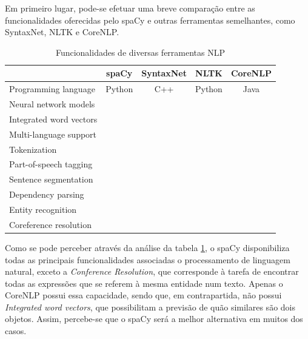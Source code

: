 \documentclass[12pt]{article}
\newcommand{\cmark}{\color[rgb]{0,0.7,0}\ding{51}}%
\newcommand{\xmark}{\color[rgb]{0.7,0,0}\ding{55}}%
\begin{document}
Em primeiro lugar, pode-se efetuar uma breve comparação entre as funcionalidades oferecidas pelo spaCy e outras ferramentas semelhantes, como SyntaxNet, NLTK e CoreNLP.

\begin{table}[!ht]
	\centering
	\renewcommand{\arraystretch}{1.3}
	\begin{tabular}{l|c|c|c|c|}
		\cline{2-5}
	& \cellcolor[HTML]{C0C0C0}\textbf{spaCy} & \cellcolor[HTML]{C0C0C0}\textbf{SyntaxNet} & \cellcolor[HTML]{C0C0C0}\textbf{NLTK} & \cellcolor[HTML]{C0C0C0}\textbf{CoreNLP} \\ \hline
	\multicolumn{1}{|l|}{\cellcolor[HTML]{C0C0C0}Programming language}
	& Python   & C++      & Python   & Java     \\ \hline
	\multicolumn{1}{|l|}{\cellcolor[HTML]{C0C0C0}Neural network models}
	&  \cmark  &  \cmark  &  \xmark  &  \cmark  \\ \hline
	\multicolumn{1}{|l|}{\cellcolor[HTML]{C0C0C0}Integrated word vectors}
	&  \cmark  &  \xmark  &  \xmark  &  \xmark  \\ \hline
	\multicolumn{1}{|l|}{\cellcolor[HTML]{C0C0C0}Multi-language support}
	&  \cmark  &  \cmark  &  \cmark  &  \cmark  \\ \hline
	\multicolumn{1}{|l|}{\cellcolor[HTML]{C0C0C0}Tokenization}
	&  \cmark  &  \cmark  &  \cmark  &  \cmark  \\ \hline
	\multicolumn{1}{|l|}{\cellcolor[HTML]{C0C0C0}Part-of-speech tagging}
	&  \cmark  &  \cmark  &  \cmark  &  \cmark  \\ \hline
	\multicolumn{1}{|l|}{\cellcolor[HTML]{C0C0C0}Sentence segmentation}
	&  \cmark  &  \cmark  &  \cmark  &  \cmark  \\ \hline
	\multicolumn{1}{|l|}{\cellcolor[HTML]{C0C0C0}Dependency parsing}
	&  \cmark  &  \cmark  &  \xmark  &  \cmark  \\ \hline
	\multicolumn{1}{|l|}{\cellcolor[HTML]{C0C0C0}Entity recognition}
	&  \cmark  &  \xmark  &  \cmark  &  \cmark  \\ \hline
	\multicolumn{1}{|l|}{\cellcolor[HTML]{C0C0C0}Coreference resolution}
	&  \xmark  &  \xmark  &  \xmark  &  \cmark  \\ \hline
	\end{tabular}
	\caption{Funcionalidades de diversas ferramentas NLP}
	\label{table:campare_features}
\end{table}

Como se pode perceber através da análise da tabela \ref{table:campare_features}, o spaCy disponibiliza todas as principais funcionalidades associadas o processamento de linguagem natural, exceto a \textit{Conference Resolution}, que corresponde à tarefa de encontrar todas as expressões que se referem à mesma entidade num texto. Apenas o CoreNLP possui essa capacidade, sendo que, em contrapartida, não possui \textit{Integrated word vectors}, que possibilitam a previsão de quão similares são dois objetos. Assim, percebe-se que o spaCy será a melhor alternativa em muitos dos casos.
\end{document}

